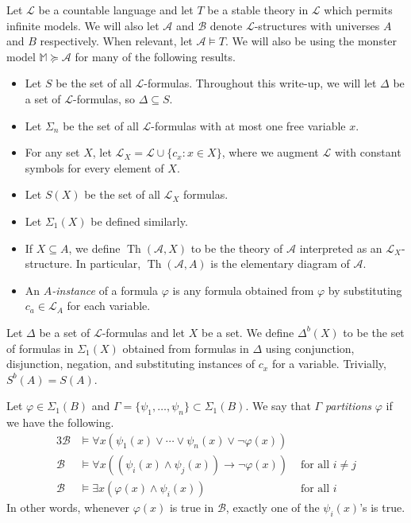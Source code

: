 \documentclass{article}
\newcommand\monster{\mathbb{M}}
\DeclareMathOperator{\Th}{Th}
\let\mc\mathcal
\begin{document}

\begin{notation}[Preliminaries] Let $\mc{L}$ be a countable language and let $T$ be a stable theory in $\mc{L}$ which permits infinite models. We will also let $\mc{A}$ and $\mc{B}$ denote $\mc{L}$-structures with universes $A$ and $B$ respectively. When relevant, let $\mc{A} \vDash T$. We will also be using the monster model $\monster \succeq \mc{A}$ for many of the following results.
    \begin{itemize}
        \item Let $S$ be the set of all $\mc{L}$-formulas. Throughout this write-up, we will let $\Delta$ be a set of $\mc{L}$-formulas, so $\Delta \subseteq S$.
        \item Let $\Sigma_n$ be the set of all $\mc{L}$-formulas with at most one free variable $x$.
        \item For any set $X$, let $\mc{L}_X = \mc{L} \cup \{ c_x : x \in X \}$, where we augment $\mc{L}$ with constant symbols for every element of $X$.
        \item Let $S(X)$ be the set of all $\mc{L}_X$ formulas.
        \item Let $\Sigma_1(X)$ be defined similarly.
        \item If $X \subseteq A$, we define $\Th(\mc{A}, X)$ to be the theory of $\mc{A}$ interpreted as an $\mc{L}_X$-structure. In particular, $\Th(\mc{A}, A)$ is the elementary diagram of $\mc{A}$.
        \item An \textit{$A$-instance} of a formula $\varphi$ is any formula obtained from $\varphi$ by substituting $c_a \in \mc{L}_A$ for each variable.
    \end{itemize}
\end{notation}

\begin{definition}
    Let $\Delta$ be a set of $\mc{L}$-formulas and let $X$ be a set. We define $\Delta^b(X)$ to be the set of formulas in $\Sigma_1(X)$ obtained from formulas in $\Delta$ using conjunction, disjunction, negation, and substituting instances of $c_x$ for a variable. Trivially, $S^b(A) = S(A)$.
\end{definition}

\begin{definition}[Partitioning]
   Let $\varphi \in \Sigma_1(B)$ and $\Gamma = \{ \psi_1, \ldots, \psi_n \} \subset \Sigma_1(B)$. We say that $\Gamma$ \textit{partitions} $\varphi$ if we have the following.
   \begin{alignat*}{3}
        \mc{B} &\vDash \forall x (\psi_1(x) \lor \cdots \lor \psi_n(x) \lor \neg \varphi(x)) \\
        \mc{B} &\vDash \forall x ((\psi_i(x) \land \psi_j(x)) \to \neg \varphi(x)) &\text{ for all } i \neq j \\
        \mc{B} &\vDash \exists x (\varphi(x) \land \psi_i(x)) &\text{ for all } i
   \end{alignat*}
   In other words, whenever $\varphi(x)$ is true in $\mc{B}$, exactly one of the $\psi_i(x)$'s is true.
\end{definition}
\end{document}
